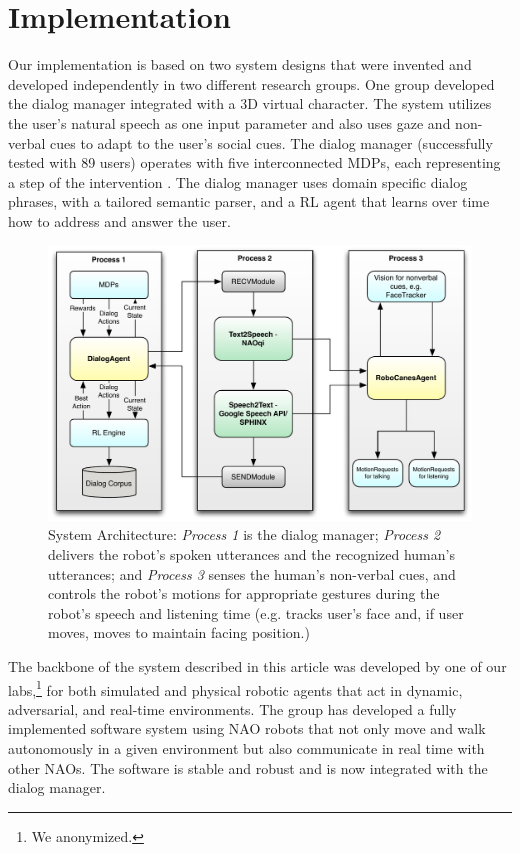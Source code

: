 \documentclass[letterpaper]{article}
\begin{document}
\section*{Implementation} 

Our implementation is based on two system designs that were 
invented and developed independently in two different research groups. One  
group developed the dialog manager integrated with a 3D virtual 
character.  The system utilizes the user's natural speech as one input parameter and also uses gaze
and non-verbal cues to adapt to the user's social cues. The dialog manager (successfully 
tested with 89 users) operates with five
interconnected MDPs, each representing a step of the intervention \cite{YASCLL14}. The dialog 
manager uses domain specific dialog phrases, with a tailored semantic parser, and a RL agent that 
learns over time how to address and answer the user. 

\begin{figure}[!t] 
\centering 
\includegraphics[width=.46\textwidth]{figures/system} 
\caption{System Architecture: {\em Process 1} is the dialog manager; {\em Process 2} delivers the 
robot's spoken utterances and the recognized human's utterances; and {\em Process 3} senses the 
human's non-verbal cues, and controls the robot's motions for appropriate gestures during the 
robot's speech and listening time (e.g. tracks user's face and, if user moves, moves to maintain 
facing position.)} 
\label{fig:system} 
\end{figure}

The backbone of the system described in this article was developed by one of our 
labs,\footnote{We anonymized.} for both simulated and
physical robotic agents that act in dynamic, adversarial, and real-time environments.    
The group has developed a fully implemented software system  using NAO robots that not 
only move and walk autonomously in a given environment but 
also communicate in real time with other NAOs. The 
software is stable and
robust and is now integrated with the dialog manager.
\end{document}
